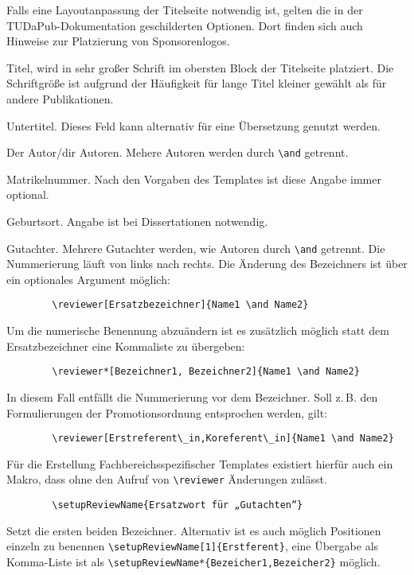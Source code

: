 \documentclass[
	german,%
	ruledheaders=section,%
	class=report,%
	thesis={type=bachelor},%
	fontsize=11pt,%
	parskip=half-,%
	custommargins=true,%
	marginpar=false,%
	accentcolor=9c,%
]{tudapub}
\begin{document}
Falls eine Layoutanpassung der Titelseite notwendig ist, gelten die in der TUDaPub-Dokumentation \cite{tudapub} geschilderten Optionen.
Dort finden sich auch Hinweise zur Platzierung von Sponsorenlogos.

\begin{description}
	\item[title] Titel, wird in sehr großer Schrift im obersten Block der Titelseite platziert.
	     Die Schriftgröße ist aufgrund der Häufigkeit für lange Titel kleiner gewählt als für andere Publikationen.

	\item[subtitle] Untertitel.
	      Dieses Feld kann alternativ für eine Übersetzung genutzt werden.

	\item[author] Der Autor/dir Autoren.
	      Mehere Autoren werden durch \verb+\and+ getrennt.

	\item[studentID] Matrikelnummer.
	      Nach den Vorgaben des Templates ist diese Angabe immer optional.

	\item[birthplace] Geburtsort.
	      Angabe ist bei Dissertationen notwendig.

	\item[reviewer] Gutachter.
	      Mehrere Gutachter werden, wie Autoren durch \verb+\and+ getrennt.
	      Die Nummerierung läuft von links nach rechts.
	      Die Änderung des Bezeichners ist über ein optionales Argument möglich:
\begin{verbatim}
        \reviewer[Ersatzbezeichner]{Name1 \and Name2}
\end{verbatim}
		Um die numerische Benennung abzuändern ist es zusätzlich möglich statt dem Ersatzbezeichner eine Kommaliste zu übergeben:
\begin{verbatim}
        \reviewer*[Bezeichner1, Bezeichner2]{Name1 \and Name2}
\end{verbatim}
		In diesem Fall entfällt die Nummerierung vor dem Bezeichner.
		Soll z.\,B. den Formulierungen der Promotionsordnung entsprochen werden, gilt:
\begin{verbatim}
        \reviewer[Erstreferent\_in,Koreferent\_in]{Name1 \and Name2}
\end{verbatim}
	      Für die Erstellung Fachbereichsspezifischer Templates existiert hierfür auch ein Makro, dass ohne den Aufruf von \verb+\reviewer+ Änderungen zulässt.
\begin{verbatim}
        \setupReviewName{Ersatzwort für „Gutachten“}
\end{verbatim}
	      Setzt die ersten beiden Bezeichner.
	      Alternativ ist es auch möglich Positionen einzeln zu benennen \verb+\setupReviewName[1]{Erstferent}+, eine Übergabe als Komma-Liste ist als \verb+\setupReviewName*{Bezeicher1,Bezeicher2}+ möglich.


\end{description}
\end{document}

